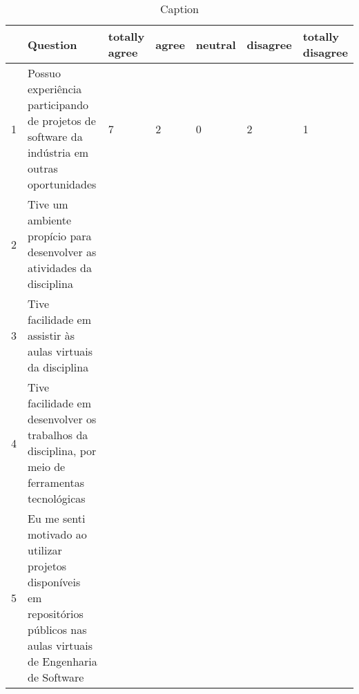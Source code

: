 \begin{table*}[htb]
    \centering
    \caption{Caption}
    \label{tab:likert_1}
    \begin{tabular}{l|p{9.25cm}|p{1.1cm}|p{1.1cm}|p{1.1cm}|p{1.1cm}|p{1.2cm}}
    \hline
    & \textbf{Question} & \textbf{totally agree} & \textbf{agree} & \textbf{neutral} & \textbf{disagree} & \textbf{totally disagree}\\
    \hline
    1 & Possuo experiência participando de projetos de software da indústria em outras oportunidades & 7 & 2 & 0 & 2 & 1 \\ \hline
    2 & Tive um ambiente propício para desenvolver as atividades da disciplina &&&&& \\
    3 & Tive facilidade em assistir às aulas virtuais da disciplina &&&&& \\
    4 & Tive facilidade em desenvolver os trabalhos da disciplina, por meio de ferramentas tecnológicas &&&&& \\
    5 & Eu me senti motivado ao utilizar projetos disponíveis em repositórios públicos nas aulas virtuais de Engenharia de Software &&&&& \\
    \hline
    \end{tabular}
\end{table*}